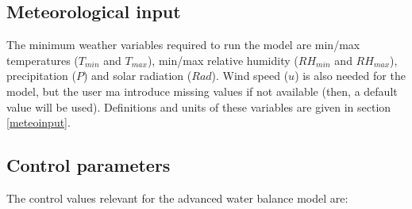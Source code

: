 \documentclass[]{book}
\begin{document}
\subsection{Meteorological input}\label{meteorological-input}

The minimum weather variables required to run the model are min/max
temperatures (\(T_{min}\) and \(T_{max}\)), min/max relative humidity
(\(RH_{min}\) and \(RH_{max}\)), precipitation (\(P\)) and solar
radiation (\(Rad\)). Wind speed (\(u\)) is also needed for the model,
but the user ma introduce missing values if not available (then, a
default value will be used). Definitions and units of these variables
are given in section \ref{meteoinput}.

\subsection{Control parameters}\label{control-parameters-2}

The control values relevant for the advanced water balance model are:
\end{document}

